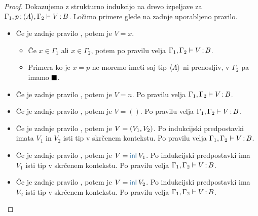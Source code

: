 \begin{proof}
	Dokazujemo z strukturno indukcijo na drevo izpeljave za $\Gamma_1, p \mathinner{:} \langle A \rangle, \Gamma_2 \vdash V \mathinner{:} B$.
	Ločimo primere glede na zadnje uporabljeno pravilo.
	
	\begin{itemize}
		\item[\sitem] Če je zadnje pravilo , potem je $V = x$.
		\begin{itemize}
			\item Če $x \in \Gamma_1$ ali $x \in \Gamma_2$, potem po pravilu  velja $\Gamma_1, \Gamma_2 \vdash V \mathinner{:} B$.
			
			\item Primera ko je $x = p$ ne moremo imeti saj tip $\langle A \rangle$ ni prenosljiv, v $\Gamma_2$ pa imamo $\blacksquare$.
		\end{itemize}
		
		\item Če je zadnje pravilo , potem je $V = n$. Po pravilu  velja $\Gamma_1, \Gamma_2 \vdash V \mathinner{:} B$.

		\item Če je zadnje pravilo , potem je $V = ()$. Po pravilu  velja $\Gamma_1, \Gamma_2 \vdash V \mathinner{:} B$.
		
		\item Če je zadnje pravilo , potem je $V =( V_1 , V_2 )$.
		Po indukcijski predpostavki imata $V_1$ in $V_2$ isti tip v skrčenem kontekstu.
		Po pravilu  velja $\Gamma_1, \Gamma_2 \vdash V \mathinner{:} B$.
		
		\item Če je zadnje pravilo , potem je $V = \tminl{V_1}$.
		Po indukcijski predpostavki ima $V_1$ isti tip v skrčenem kontekstu.
		Po pravilu  velja $\Gamma_1, \Gamma_2 \vdash V \mathinner{:} B$.
		
		\item Če je zadnje pravilo , potem je $V = \tminl{V_2}$.
		Po indukcijski predpostavki ima $V_2$ isti tip v skrčenem kontekstu.
		Po pravilu  velja $\Gamma_1, \Gamma_2 \vdash V \mathinner{:} B$.
		

\end{itemize}
\end{proof}
